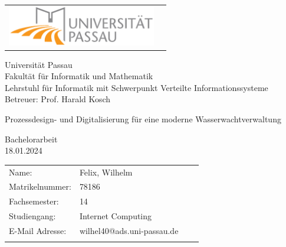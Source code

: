 \documentclass[fontsize=12pt,openright,oneside,paper=a4,BCOR=1cm]{scrbook}
\makeatletter
\newcommand{\authorname}{Felix, Wilhelm}
\newcommand{\immatriculationnumber}{78186}
\newcommand{\studypath}{Internet Computing}
\newcommand{\currentsemester}{14}
\newcommand{\email}{wilhel40@ads.uni-passau.de}
\newcommand{\worktitle}{Prozessdesign- und Digitalisierung für eine moderne Wasserwachtverwaltung}
\newcommand{\thesisdate}{18.01.2024}
\newcommand{\thesisprof}{Prof. Harald Kosch}
\newcommand{\faculty}{Fakultät für Informatik und Mathematik}
\newcommand{\chair}{Lehrstuhl für Informatik mit Schwerpunkt Verteilte Informationssysteme}
\makeatother
\begin{document}
\thispagestyle{empty}

\vspace{1cm}

\begin{center}
\begin{tabular}{lr}
\includegraphics[width=6.5cm]{logouni.pdf}
\end{tabular}

\vspace{1.0cm}
\Large Universität Passau
\\
\Large \faculty
\\
\vspace{0.3cm}
\large \chair
\\
\vspace{0.3cm}
\large Betreuer: \thesisprof
\\


\end{center}


\vspace{1.5cm}

\begin{center}
        {\Huge \worktitle } %
\end{center}
\vspace{1.5cm}
\begin{center}

        {\LARGE Bachelorarbeit}
        \\
        {\large
        \vspace{0.3cm}
        }
        {\large
        \vspace{0.1cm}
        \thesisdate
        }
\end{center}

\vspace{0.8cm}



\vfill {%

\vfill


{\normalsize
\begin{tabular}[l]{llll}
Name:     &  \authorname \\
Matrikelnummer:       & \immatriculationnumber \\
Fachsemester:       & \currentsemester \\
Studiengang:       & \studypath \\
E-Mail Adresse:       & \email \\
\smallskip \\

\end{tabular}}
} \cleardoublepage
\end{document}
